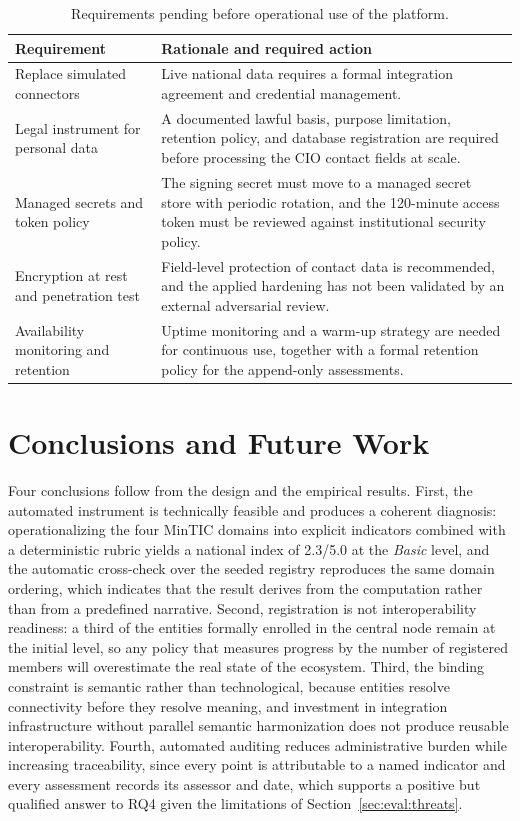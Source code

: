 \documentclass[runningheads]{llncs}
\begin{document}
\begin{table}[t]
\caption{Requirements pending before operational use of the platform.}
\label{tab:pending}
\centering
\setlength{\tabcolsep}{4pt}
\footnotesize
\begin{tabular}{p{3.6cm}p{7.9cm}}
\toprule
Requirement & Rationale and required action \\
\midrule
Replace simulated connectors & Live national data requires a formal
integration agreement and credential management. \\
\addlinespace
Legal instrument for personal data & A documented lawful basis, purpose
limitation, retention policy, and database registration are required before
processing the CIO contact fields at scale. \\
\addlinespace
Managed secrets and token policy & The signing secret must move to a managed
secret store with periodic rotation, and the 120-minute access token must be
reviewed against institutional security policy. \\
\addlinespace
Encryption at rest and penetration test & Field-level protection of contact
data is recommended, and the applied hardening has not been validated by an
external adversarial review. \\
\addlinespace
Availability monitoring and retention & Uptime monitoring and a warm-up
strategy are needed for continuous use, together with a formal retention
policy for the append-only assessments. \\
\bottomrule
\end{tabular}
\end{table}

\section{Conclusions and Future Work}
\label{sec:conclusions}

Four conclusions follow from the design and the empirical results. First, the
automated instrument is technically feasible and produces a coherent
diagnosis: operationalizing the four MinTIC domains into explicit indicators
combined with a deterministic rubric yields a national index of 2.3/5.0 at the
\emph{Basic} level, and the automatic cross-check over the seeded registry
reproduces the same domain ordering, which indicates that the result derives
from the computation rather than from a predefined narrative. Second,
registration is not interoperability readiness: a third of the entities
formally enrolled in the central node remain at the initial level, so any
policy that measures progress by the number of registered members will
overestimate the real state of the ecosystem. Third, the binding constraint is
semantic rather than technological, because entities resolve connectivity
before they resolve meaning, and investment in integration infrastructure
without parallel semantic harmonization does not produce reusable
interoperability. Fourth, automated auditing reduces administrative burden
while increasing traceability, since every point is attributable to a named
indicator and every assessment records its assessor and date, which supports a
positive but qualified answer to RQ4 given the limitations of
Section~\ref{sec:eval:threats}.
\end{document}
